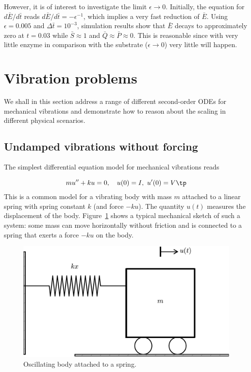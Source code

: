 \documentclass[graybox,envcountchap,sectrefs,final]{svmonodo}
\begin{document}
However, it is of interest to investigate the limit $\epsilon\rightarrow 0$.
Initially, the equation for $d\bar E/d\bar t$ reads
$d\bar E/d\bar t = -\epsilon^{-1}$, which implies a very fast reduction of
$\bar E$. Using $\epsilon=0.005$ and $\Delta\bar t = 10^{-3}$, simulation
results show that $\bar E$ decays to approximately zero at $t=0.03$ while
$\bar S\approx 1$ and $\bar Q \approx \bar P\approx 0$.
This is reasonable since with
very little enzyme in comparison with the substrate ($\epsilon\rightarrow 0$)
very little will happen.

\section{Vibration problems}
\label{sec:scale:vib}

We shall in this section
address a range of different second-order ODEs for mechanical
vibrations and demonstrate how to reason about the scaling in
different physical scenarios.


\subsection{Undamped vibrations without forcing}
\label{sec:scale:vib:undamped}

The simplest differential equation model for mechanical vibrations
reads

\begin{equation}
mu'' + ku = 0,\quad u(0)=I,\ u'(0)=V\tp
\label{sec:scale:vib:undamped:model}
\end{equation}
This is a common model for a vibrating body  with mass $m$ attached
to a linear spring with spring constant $k$ (and force $-ku$).
The quantity $u(t)$ measures the displacement of the body.
Figure~\ref{sec:scale:vib:undamped:sketch} shows a typical mechanical
sketch of such a system: some mass can move horizontally without friction
and is connected to a spring that exerts a force $-ku$ on the body.


\begin{figure}[!ht]  %
  \centerline{\includegraphics[width=0.6\linewidth]{fig-scaling/oscillator_spring.pdf}}
  \caption{
  Oscillating body attached to a spring. \label{sec:scale:vib:undamped:sketch}
  }
\end{figure}
\end{document}
